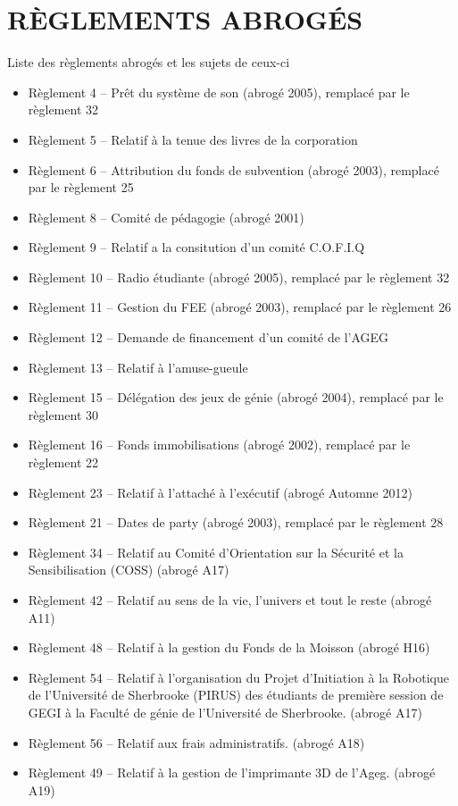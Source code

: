 \chapter*{RÈGLEMENTS ABROGÉS}
Liste des règlements abrogés et les sujets de ceux-ci

\begin{itemize}
\item[]{Règlement 4 – Prêt du système de son (abrogé 2005), remplacé par le règlement 32}
\item[]{Règlement 5 – Relatif à la tenue des livres de la corporation}
\item[]{Règlement 6 – Attribution du fonds de subvention (abrogé 2003), remplacé par le règlement 25}
\item[]{Règlement 8 – Comité de pédagogie (abrogé 2001)}
\item[]{Règlement 9 – Relatif a la consitution d'un comité C.O.F.I.Q}
\item[]{Règlement 10 – Radio étudiante (abrogé 2005), remplacé par le règlement 32}
\item[]{Règlement 11 – Gestion du FEE (abrogé 2003), remplacé par le règlement 26}
\item[]{Règlement 12 – Demande de financement d'un comité de l'AGEG}
\item[]{Règlement 13 – Relatif à l'amuse-gueule}
\item[]{Règlement 15 – Délégation des jeux de génie (abrogé 2004), remplacé par le règlement 30}
\item[]{Règlement 16 – Fonds immobilisations (abrogé 2002), remplacé par le règlement 22}
\item[]{Règlement 23 – Relatif à l’attaché à l’exécutif (abrogé Automne 2012)}
\item[]{Règlement 21 – Dates de party (abrogé 2003), remplacé par le règlement 28}
\item[]{Règlement 34 – Relatif au Comité d’Orientation sur la Sécurité et la Sensibilisation (COSS) (abrogé A17)}
\item[]{Règlement 42 – Relatif au sens de la vie, l’univers et tout le reste (abrogé A11)}
\item[]{Règlement 48 – Relatif à la gestion du Fonds de la Moisson (abrogé H16)}
\item[]{Règlement 54 – Relatif à l’organisation du Projet d’Initiation à la Robotique de l’Université de Sherbrooke (PIRUS) des étudiants de première session de GEGI à la Faculté de génie de l’Université de Sherbrooke. (abrogé A17)}
\item[]{Règlement 56 – Relatif aux frais administratifs. (abrogé A18)}
\item[]{Règlement 49 – Relatif à la gestion de l'imprimante 3D de l'Ageg. (abrogé A19)}
\end{itemize}
